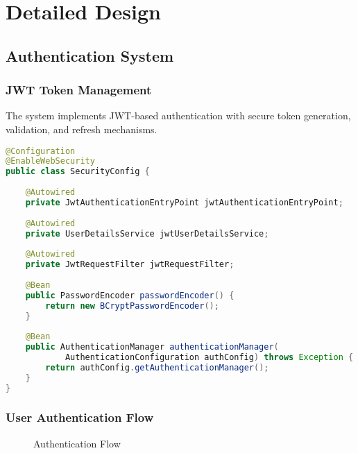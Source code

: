 \documentclass[12pt,a4paper]{article}
\begin{document}
\section{Detailed Design}

\subsection{Authentication System}

\subsubsection{JWT Token Management}

The system implements JWT-based authentication with secure token generation, validation, and refresh mechanisms.

\begin{lstlisting}[language=Java, caption=JWT Token Configuration]
@Configuration
@EnableWebSecurity
public class SecurityConfig {
    
    @Autowired
    private JwtAuthenticationEntryPoint jwtAuthenticationEntryPoint;
    
    @Autowired
    private UserDetailsService jwtUserDetailsService;
    
    @Autowired
    private JwtRequestFilter jwtRequestFilter;
    
    @Bean
    public PasswordEncoder passwordEncoder() {
        return new BCryptPasswordEncoder();
    }
    
    @Bean
    public AuthenticationManager authenticationManager(
            AuthenticationConfiguration authConfig) throws Exception {
        return authConfig.getAuthenticationManager();
    }
}
\end{lstlisting}

\subsubsection{User Authentication Flow}

\begin{figure}[H]
\centering
{}
\caption{Authentication Flow}
\label{fig:auth-flow}
\end{figure}
\end{document}

